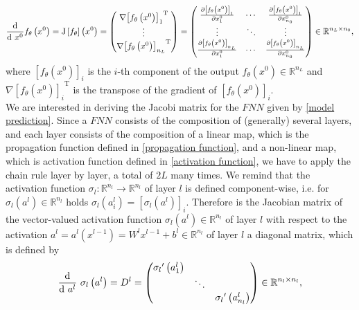 \begin{equation}
    \label{Jacobi}
    \frac{\textup{d}}{\textup{d} \ x^0} f_{\theta}\left(x^0\right) = \mathrm{J} \left[f_{\theta} \right]\left(x^0\right) = \begin{pmatrix} \nabla {\left[f_{\theta}\left(x^0\right)\right]_{1}}^{\mathrm{T}} \\ \vdots \\  \nabla {\left[f_{\theta}\left(x^0\right)\right]_{n_L}}^{\mathrm{T}} \end{pmatrix} = \begin{pmatrix} \frac{\partial \left[f_{\theta}\left(x^0\right)\right]_1}{\partial x^0_{1}} & \cdots & \frac{\partial \left[f_{\theta}\left(x^0\right)\right]_1}{\partial x^0_{n_0}} \\ \vdots & \ddots & \vdots \\ \frac{\partial \left[f_{\theta}\left(x^0\right)\right]_{n_L}}{\partial x^0_{1}} & \cdots & \frac{\partial \left[f_{\theta}\left(x^0\right)\right]_{n_L}}{\partial x^0_{n_0}} \end{pmatrix} \in \mathbb{R}^{n_L \times n_0}, 
\end{equation}
where $\left[f_{\theta}\left(x^0\right)\right]_i$ is the $i$-th component of the output $f_{\theta}\left(x^0\right) \in \mathbb{R}^{n_L}$ and $\nabla {\left[f_{\theta}\left(x^0\right)\right]_i}^{\mathrm{T}}$ is the transpose of the gradient of $\left[f_{\theta}\left(x^0\right)\right]_i$. \\
We are interested in deriving the Jacobi matrix for the $FNN$ given by \cref{model prediction}. Since a $FNN$ consists of the composition of (generally) several layers, and each layer consists of the composition of a linear map, which is the propagation function defined in \cref{propagation function}, and a non-linear map, which is activation function defined in \cref{activation function}, we have to apply the chain rule layer by layer, a total of $2L$ many times. We remind that the activation function $\sigma_{l} \colon \mathbb{R}^{n_l} \to \mathbb{R}^{n_l}$ of layer $l$ is defined component-wise, i.e. for $\sigma_{l}\left(a^l\right) \in \mathbb{R}^{n_l}$ holds $\sigma_{l}\left(a^l_i\right) = \left[ \sigma_{l}\left(a^l\right) \right]_i$. Therefore is the Jacobian matrix of the vector-valued activation function $\sigma_{l}\left(a^l\right) \in \mathbb{R}^{n_l}$ of layer $l$ with respect to the activation $a^l = a^l\left(x^{l-1}\right) = W^{l} x^{l-1} + b^{l} \in \mathbb{R}^{n_l}$ of layer $l$ a diagonal matrix, which is defined by
\begin{equation}
    \label{derivative:activation:function}
    \frac{\textup{d}}{\textup{d} \ a^{l}} \ \sigma_{l} \left(a^l\right) = D^{l} = \begin{pmatrix} {\sigma_{l}}^{\prime} \left( a^{l}_1 \right) & & \\ & \ddots & \\ & & {\sigma_{l}}^{\prime} \left( a^{l}_{n_l} \right) \end{pmatrix} \in \mathbb{R}^{n_l \times n_l}, 
\end{equation}
